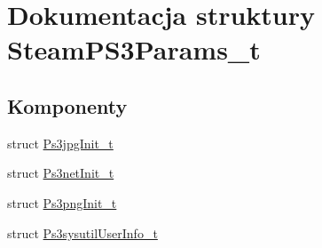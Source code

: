 \hypertarget{struct_steam_p_s3_params__t}{}\section{Dokumentacja struktury Steam\+P\+S3\+Params\+\_\+t}
\label{struct_steam_p_s3_params__t}
\subsection*{Komponenty}
\begin{DoxyCompactItemize}
\item 
struct \hyperlink{struct_steam_p_s3_params__t_1_1_ps3jpg_init__t}{Ps3jpg\+Init\+\_\+t}
\item 
struct \hyperlink{struct_steam_p_s3_params__t_1_1_ps3net_init__t}{Ps3net\+Init\+\_\+t}
\item 
struct \hyperlink{struct_steam_p_s3_params__t_1_1_ps3png_init__t}{Ps3png\+Init\+\_\+t}
\item 
struct \hyperlink{struct_steam_p_s3_params__t_1_1_ps3sysutil_user_info__t}{Ps3sysutil\+User\+Info\+\_\+t}
\end{DoxyCompactItemize}
